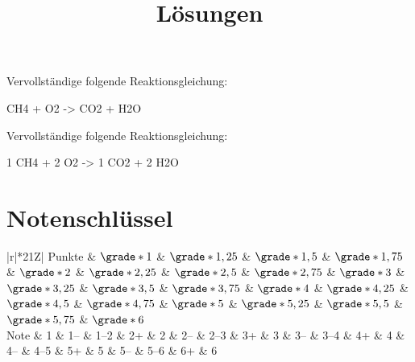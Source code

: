 \documentclass[chem]{kska}
\begin{document}
  \begin{question}
    Vervollständige folgende Reaktionsgleichung:
    \begin{reaction*}
      \qquad CH4 + \qquad O2 -> \qquad CO2 + \qquad H2O
    \end{reaction*}
  \end{question}
  \begin{solution}
    Vervollständige folgende Reaktionsgleichung:
    \begin{reaction*}
      1 CH4 + 2 O2 -> 1 CO2 + 2 H2O
    \end{reaction*}
  \end{solution}

  \vfill
  
  \selfeval
  \markingbox
  
  \newpage
  
  \title{Lösungen}
  \maketitle
  \printsolutions
  
  \vfill
  
  \section*{Notenschlüssel}
  \footnotesize\setlength\tabcolsep{2pt}
  \begin{tabularx}{\linewidth}{|r|*{21}{Z|}}
  \toprule
  Punkte
  & $\grade*{1}$ & $\grade*{1,25}$ & $\grade*{1,5}$ & $\grade*{1,75}$
  & $\grade*{2}$ & $\grade*{2,25}$ & $\grade*{2,5}$ & $\grade*{2,75}$
  & $\grade*{3}$ & $\grade*{3,25}$ & $\grade*{3,5}$ & $\grade*{3,75}$
  & $\grade*{4}$ & $\grade*{4,25}$ & $\grade*{4,5}$ & $\grade*{4,75}$
  & $\grade*{5}$ & $\grade*{5,25}$ & $\grade*{5,5}$ & $\grade*{5,75}$
  & $\grade*{6}$ \\
  \midrule
  Note
  & 1 & 1-- & 1--2 & 2+ 
  & 2 & 2-- & 2--3 & 3+
  & 3 & 3-- & 3--4 & 4+
  & 4 & 4-- & 4--5 & 5+
  & 5 & 5-- & 5--6 & 6+
  & 6 \\
  \bottomrule
  \end{tabularx}
  
  
\end{document}
